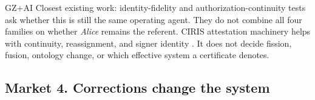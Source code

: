 \begin{authbar}{GZ+AI}
Closest existing work: identity-fidelity and authorization-continuity tests \autocite{kodasoken2026identityfidelity,mcguinness2026missioncontinuation} ask whether this is still the same operating agent.
They do not combine all four families on whether \emph{Alice} remains the referent.
CIRIS attestation machinery helps with continuity, reassignment, and signer identity \autocite{ciris2026ceg,cirisai2026verify}.
It does not decide fission, fusion, ontology change, or which effective system a certificate denotes.
\end{authbar}
\authbarneedspace

\subsection{Market 4. Corrections change the system}
\label{sec:appp-m4}

